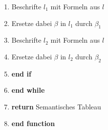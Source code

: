 \begin{enumerate}[wide=0em, leftmargin=*, label=\arabic*, itemsep=0pt, parsep=0pt, font=\scriptsize]
\item \tabto{1.5cm} Beschrifte $l_1$ mit Formeln aus $l$
\item \tabto{1.5cm} Ersetze dabei $\beta$ in $l_1$ durch $\beta_1$
\item \tabto{1.5cm} Beschrifte $l_2$ mit Formeln aus $l$
\item \label{TableauAl_24}\tabto{1.5cm} Ersetze dabei $\beta$ in $l_2$ durch $\beta_2$
\item \tabto{1cm} \textbf{end if} 
\item \tabto{0.5cm} \textbf{end while}
\item \tabto{0.5cm} \textbf{return}  Semantisches Tableau
\item \textbf{end function}
\end{enumerate}



